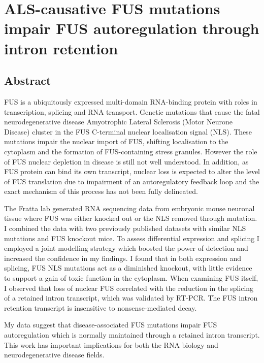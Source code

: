 \chapter{ALS-causative FUS mutations impair FUS autoregulation through intron retention}

\label{chapter:fus_meta}

\section{Abstract}

FUS is a ubiquitously expressed multi-domain RNA-binding protein with roles in transcription, splicing and RNA transport. Genetic mutations that cause the fatal neurodegenerative disease Amyotrophic Lateral Sclerosis (Motor Neurone Disease) cluster in the FUS C-terminal nuclear localisation signal (NLS).  These mutations impair the nuclear import of FUS,  shifting localisation to the cytoplasm and the formation of FUS-containing stress granules. However the role of FUS nuclear depletion in disease is still not well understood.  In addition, as FUS protein can bind its own transcript, nuclear loss is expected to alter the level of FUS translation due to impairment of an autoregulatory feedback loop and the exact mechanism of this process has not been fully delineated.

The Fratta lab generated RNA sequencing data from embryonic mouse neuronal tissue where FUS was either knocked out or the NLS removed through mutation. I combined the data with two previously published datasets with similar NLS mutations and FUS knockout mice. To assess differential expression and splicing I employed a joint modelling strategy which boosted the power of detection and increased the confidence in my findings. I found that in both expression and splicing, FUS NLS mutations act as a diminished knockout, with little evidence to support a gain of toxic function in the cytoplasm. When examining FUS itself, I observed that loss of nuclear FUS correlated with the reduction in the splicing of a retained intron transcript, which was validated by RT-PCR. The FUS intron retention transcript is insensitive to nonsense-mediated decay.

My data suggest that disease-associated FUS mutations impair FUS autoregulation which is normally maintained through a retained intron transcript. This work has important implications for both the RNA biology and neurodegenerative disease fields.

